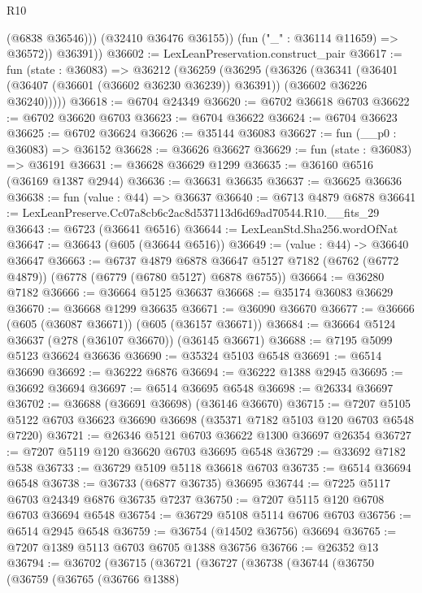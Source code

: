 \begin{lexlean}{R10}
\begin{coremodule}
                (@6838 @36546)))
            (@32410 @36476 @36155))
          (fun ("_" : @36114 @11659) => @36572))
        @36391))
@36602 := LexLeanPreservation.construct_pair
@36617 := fun (state : @36083) =>
  @36212
    (@36259
      (@36295
        (@36326
          (@36341
            (@36401 (@36407 (@36601 (@36602 @36230 @36239)) @36391))
            (@36602 @36226 @36240)))))
@36618 := @6704 @24349
@36620 := @6702 @36618 @6703
@36622 := @6702 @36620 @6703
@36623 := @6704 @36622
@36624 := @6704 @36623
@36625 := @6702 @36624
@36626 := @35144 @36083
@36627 := fun (__p0 : @36083) => @36152
@36628 := @36626 @36627
@36629 := fun (state : @36083) => @36191
@36631 := @36628 @36629 @1299
@36635 := @36160 @6516 (@36169 @1387 @2944)
@36636 := @36631 @36635
@36637 := @36625 @36636
@36638 := fun (value : @44) => @36637
@36640 := @6713 @4879 @6878
@36641 := LexLeanPreserve.Cc07a8cb6c2ac8d537113d6d69ad70544.R10.__fits_29
@36643 := @6723 (@36641 @6516)
@36644 := LexLeanStd.Sha256.wordOfNat
@36647 := @36643 (@605 (@36644 @6516))
@36649 := (value : @44) -> @36640 @36647
@36663 := @6737
    @4879
    @6878
    @36647
    @5127
    @7182
    (@6762 (@6772 @4879))
    (@6778 (@6779 (@6780 @5127) @6878 @6755))
@36664 := @36280 @7182
@36666 := @36664 @5125 @36637
@36668 := @35174 @36083 @36629
@36670 := @36668 @1299 @36635
@36671 := @36090 @36670
@36677 := @36666 (@605 (@36087 @36671)) (@605 (@36157 @36671))
@36684 := @36664 @5124 @36637 (@278 (@36107 @36670)) (@36145 @36671)
@36688 := @7195 @5099 @5123 @36624 @36636
@36690 := @35324 @5103 @6548
@36691 := @6514 @36690
@36692 := @36222 @6876
@36694 := @36222 @1388 @2945
@36695 := @36692 @36694
@36697 := @6514 @36695 @6548
@36698 := @26334 @36697
@36702 := @36688 (@36691 @36698) (@36146 @36670)
@36715 := @7207 @5105 @5122 @6703 @36623 @36690 @36698 (@35371 @7182 @5103 @120 @6703 @6548 @7220)
@36721 := @26346 @5121 @6703 @36622 @1300 @36697 @26354
@36727 := @7207 @5119 @120 @36620 @6703 @36695 @6548
@36729 := @33692 @7182 @538
@36733 := @36729 @5109 @5118 @36618 @6703
@36735 := @6514 @36694 @6548
@36738 := @36733 (@6877 @36735) @36695
@36744 := @7225 @5117 @6703 @24349 @6876 @36735 @7237
@36750 := @7207 @5115 @120 @6708 @6703 @36694 @6548
@36754 := @36729 @5108 @5114 @6706 @6703
@36756 := @6514 @2945 @6548
@36759 := @36754 (@14502 @36756) @36694
@36765 := @7207 @1389 @5113 @6703 @6705 @1388 @36756
@36766 := @26352 @13
@36794 := @36702
    (@36715
      (@36721
        (@36727
          (@36738
            (@36744
              (@36750
                (@36759
                  (@36765
                    (@36766 @1388)

\end{coremodule}
\end{lexlean}
